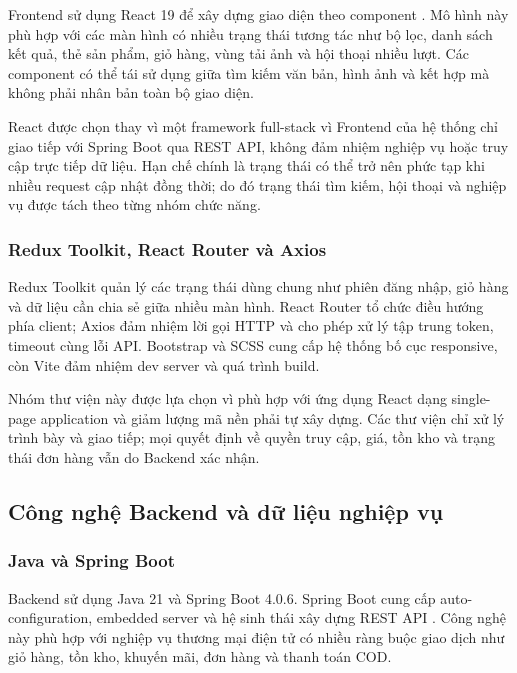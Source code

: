 Frontend sử dụng React 19 để xây dựng giao diện theo component \parencite{reactdocs2024}. Mô hình này phù hợp với các màn hình có nhiều trạng thái tương tác như bộ lọc, danh sách kết quả, thẻ sản phẩm, giỏ hàng, vùng tải ảnh và hội thoại nhiều lượt. Các component có thể tái sử dụng giữa tìm kiếm văn bản, hình ảnh và kết hợp mà không phải nhân bản toàn bộ giao diện.

React được chọn thay vì một framework full-stack vì Frontend của hệ thống chỉ giao tiếp với Spring Boot qua REST API, không đảm nhiệm nghiệp vụ hoặc truy cập trực tiếp dữ liệu. Hạn chế chính là trạng thái có thể trở nên phức tạp khi nhiều request cập nhật đồng thời; do đó trạng thái tìm kiếm, hội thoại và nghiệp vụ được tách theo từng nhóm chức năng.

\subsubsection{Redux Toolkit, React Router và Axios}

Redux Toolkit quản lý các trạng thái dùng chung như phiên đăng nhập, giỏ hàng và dữ liệu cần chia sẻ giữa nhiều màn hình. React Router tổ chức điều hướng phía client; Axios đảm nhiệm lời gọi HTTP và cho phép xử lý tập trung token, timeout cùng lỗi API. Bootstrap và SCSS cung cấp hệ thống bố cục responsive, còn Vite đảm nhiệm dev server và quá trình build.

Nhóm thư viện này được lựa chọn vì phù hợp với ứng dụng React dạng single-page application và giảm lượng mã nền phải tự xây dựng. Các thư viện chỉ xử lý trình bày và giao tiếp; mọi quyết định về quyền truy cập, giá, tồn kho và trạng thái đơn hàng vẫn do Backend xác nhận.

\subsection{Công nghệ Backend và dữ liệu nghiệp vụ}

\subsubsection{Java và Spring Boot}

Backend sử dụng Java 21 và Spring Boot 4.0.6. Spring Boot cung cấp auto-configuration, embedded server và hệ sinh thái xây dựng REST API \parencite{springbootdocs2024}. Công nghệ này phù hợp với nghiệp vụ thương mại điện tử có nhiều ràng buộc giao dịch như giỏ hàng, tồn kho, khuyến mãi, đơn hàng và thanh toán COD.

